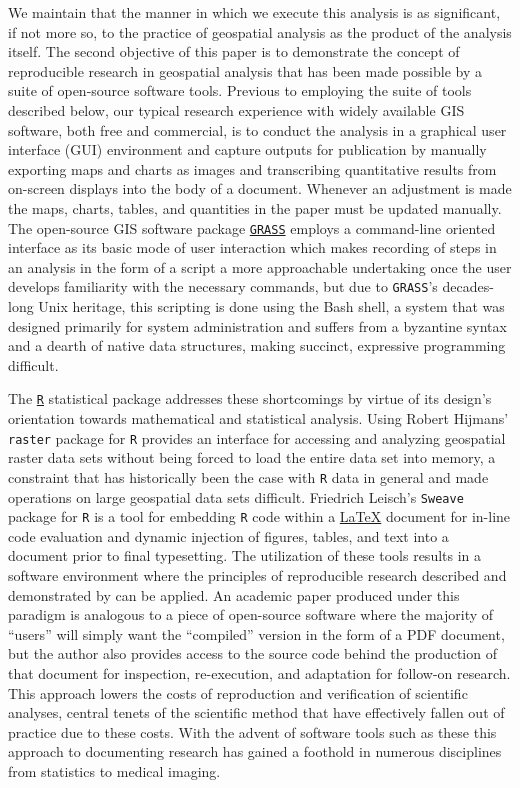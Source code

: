 We maintain that the manner in which we execute this analysis is as
significant, if not more so, to the practice of geospatial analysis as
the product of the analysis itself.  The second objective of this
paper is to demonstrate the concept of reproducible research in
geospatial analysis that has been made possible by a suite of
open-source software tools.  Previous to employing the suite of tools
described below, our typical research experience with widely available
GIS software, both free and commercial, is to conduct the analysis in
a graphical user interface (GUI) environment and capture outputs for
publication by manually exporting maps and charts as images and
transcribing quantitative results from on-screen displays into the
body of a document.  Whenever an adjustment is made the maps, charts,
tables, and quantities in the paper must be updated manually.  The
open-source GIS software package
\href{http://grass.osgeo.org/}{\texttt{GRASS}} \citep{GRASS} employs a
command-line oriented interface as its basic mode of user interaction
which makes recording of steps in an analysis in the form of a script
a more approachable undertaking once the user develops familiarity
with the necessary commands, but due to \texttt{GRASS}'s decades-long Unix
heritage, this scripting is done using the Bash shell, a system that
was designed primarily for system administration and suffers from a
byzantine syntax and a dearth of native data structures, making
succinct, expressive programming difficult.

The \href{http://www.r-project.org/}{\texttt{R}} statistical package
addresses these shortcomings \citep{R} by virtue of its design's
orientation towards mathematical and statistical analysis.  Using
Robert Hijmans' \citeyearpar{Hijmans2011} \texttt{raster} package for
\texttt{R} provides an interface for accessing and analyzing
geospatial raster data sets without being forced to load the entire
data set into memory, a constraint that has historically been the case
with \texttt{R} data in general and made operations on large
geospatial data sets difficult.  Friedrich Leisch's
\citeyearpar{Leisch2002} \texttt{Sweave} package for \texttt{R} is a
tool for embedding \texttt{R} code within a
\href{http://www.latex-project.org/}{\LaTeX} \citep{Lamport1994}
document for in-line code evaluation and dynamic injection of figures,
tables, and text into a document prior to final typesetting.  The
utilization of these tools results in a software environment where the
principles of reproducible research described and demonstrated by
\citet{Gentleman2007} can be applied.  An academic paper produced
under this paradigm is analogous to a piece of open-source software
where the majority of ``users'' will simply want the ``compiled''
version in the form of a PDF document, but the author also provides
access to the source code behind the production of that document
for inspection, re-execution, and adaptation for follow-on research.
This approach lowers the costs of reproduction and verification of
scientific analyses, central tenets of the scientific method that have
effectively fallen out of practice due to these costs.  With the
advent of software tools such as these this approach to documenting
research has gained a foothold in numerous disciplines from statistics
to medical imaging.

